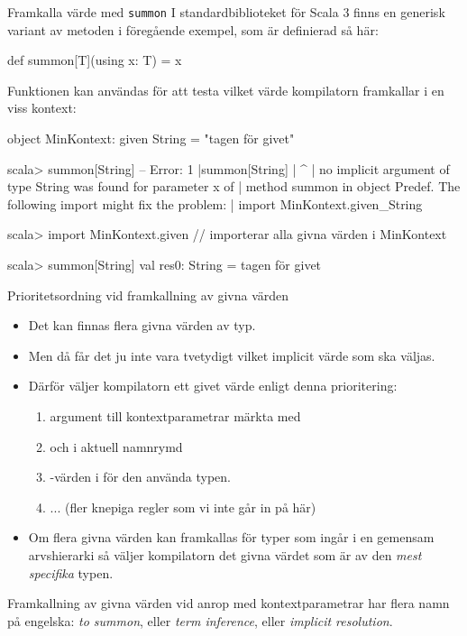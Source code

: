 \begin{Slide}{Framkalla värde med \texttt{summon}}\SlideFontSmall
I standardbiblioteket för Scala 3 finns en generisk variant av metoden  i föregående exempel, som är definierad så här:
\begin{Code}
def summon[T](using x: T) = x 
\end{Code}
Funktionen  kan användas för att testa vilket värde kompilatorn framkallar i en viss kontext:
\begin{Code}
object MinKontext:
  given String = "tagen för givet"
\end{Code}
\vspace{-0.9em}
\begin{REPLsmall}
scala> summon[String]
-- Error:
1 |summon[String]
  |              ^
  | no implicit argument of type String was found for parameter x of 
  | method summon in object Predef. The following import might fix the problem:
  | import MinKontext.given_String

scala> import MinKontext.given    // importerar alla givna värden i MinKontext

scala> summon[String]
val res0: String = tagen för givet
\end{REPLsmall}
\end{Slide}

\begin{Slide}{Prioritetsordning vid framkallning av givna värden}\SlideFontSmall
\begin{itemize}\SlideFontSmall
\item Det kan finnas flera  givna värden av  typ.
\item Men då får det ju inte vara tvetydigt vilket implicit värde som ska väljas.
\item Därför väljer kompilatorn ett givet värde enligt denna prioritering:
\begin{enumerate}\SlideFontTiny
\item {} argument till kontextparametrar märkta med 
\item {} och  i aktuell namnrymd  
\item {}-värden i  för den använda typen.
\item ... (fler knepiga regler som vi inte går in på här)
\end{enumerate}
\item Om flera givna värden kan framkallas för typer som ingår i en gemensam arvshierarki så väljer kompilatorn det givna värdet som är av den \emph{mest specifika} typen.
\end{itemize}
Framkallning av givna värden vid anrop med kontextparametrar har flera namn på engelska: \emph{to summon}, eller \emph{term inference}, eller \emph{implicit resolution}. 
\end{Slide}

